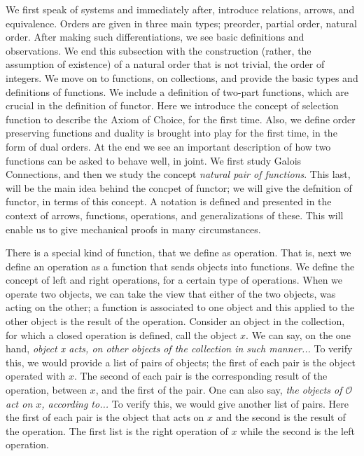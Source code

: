 \documentclass [12pt]{book}
\begin{document}
We first speak of systems and immediately after, introduce relations, arrows,  and equivalence. Orders are given in three main types; preorder, partial order, natural order. After making such differentiations, we see basic definitions and observations. We end this subsection with the construction (rather, the assumption of existence) of a natural order that is not trivial, the order of integers. We move on to functions, on collections, and provide the basic types and definitions of functions. We include a definition of two-part functions, which are crucial in the definition of functor. Here we introduce the concept of selection function to describe the Axiom of Choice, for the first time. Also, we define order preserving functions and duality is brought into play for the first time, in the form of dual orders. At the end we see an important description of how two functions can be asked to behave well, in joint. We first study Galois Connections, and then we study the concept \textit{natural pair of functions}. This last, will be the main idea behind the concpet of functor; we will give the defnition of functor, in terms of this concept. A notation is defined and presented in the context of arrows, functions, operations, and generalizations of these. This will enable us to give mechanical proofs in many circumstances.

There is a special kind of function, that we define as operation. That is, next we define an operation as a function that sends objects into functions. We define the concept of left and right operations, for a certain type of operations. When we operate two objects, we can take the view that either of the two objects, was acting on the other; a function is associated to one object and this applied to the other object is the result of the operation. Consider an object in the collection, for which a closed operation is defined, call the object $x$. We can say, on the one hand, \textit{object x acts, on other objects of the collection in such manner...} To verify this, we would provide a list of pairs of objects; the first of each pair is the object operated with $x$. The second of each pair is the corresponding result of the operation, between $x$, and the first of the pair. One can also say, \textit{the objects of $\mathcal O$ act on $x$, according to...} To verify this, we would give another list of pairs. Here the first of each pair is the object that acts on $x$ and the second is the result of the operation. The first list is the right operation of $x$ while the second is the left operation.
\end{document}
